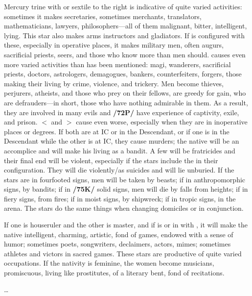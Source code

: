 Mercury \marginnote{\Mercury \Trine \Mars} trine with \Mars\xspace or sextile to the right is indicative of quite varied activities: sometimes it makes secretaries, sometimes merchants, translators, mathematicians, lawyers, philosophers—all of them malignant, bitter, intelligent, lying. This star also makes arms instructors and gladiators. If \Jupiter\xspace is configured with these, especially in operative places, it makes military men, often augurs, sacrificial priests,
seers, and those who know more than men should. \Mercury\xspace \Square\xspace causes even more varied activities than has been mentioned: magi, wanderers, sacrificial priests, doctors, astrologers, demagogues, bankers, counterfeiters, forgers, those making their living by crime, violence, and trickery. Men become thieves, perjurers, atheists, and those who prey on their fellows, are greedy for gain, who are defrauders—in short, those who have nothing admirable in them. As a result, they are involved in many evils and \textbf{/72P/} have experience of captivity, exile, and prison. $<$\Mars\xspace and \Mercury$>$ cause even worse, especially when they are in inoperative places or degrees. If both are at IC or in the Descendant, or if one is in the Descendant while the other is at  IC, they cause murders; the native will be an accomplice and will make his living as a
bandit. A few will be fratricides and their final end will be violent, especially if the stars include the \Moon\xspace in their configuration. They will die violently/as suicides and will lie unburied. If the stars are in fourfooted signs, men will be taken by beasts; if in anthropomorphic signs, by bandits; if in \textbf{/75K/} solid signs, men will die by falls from heights; if in fiery signs, from fires; if in moist signs, by shipwreck; if in tropic
signs, in the arena. \mndl The stars do the same things when changing domiciles or in conjunction. 

If one is houseruler and the other is master, and if \Mercury\xspace is \Sextile\xspace or in \Conjunction\xspace with \Venus, it will make the native intelligent, charming, artistic, fond of games, endowed with a sense of humor; sometimes poets, songwriters, declaimers, actors, mimes; sometimes athletes and victors in sacred games. These stars are productive of quite varied occupations. If the nativity is feminine, the women become musicians, promiscuous, living like prostitutes, of a literary bent, fond of recitations.

\ldots

